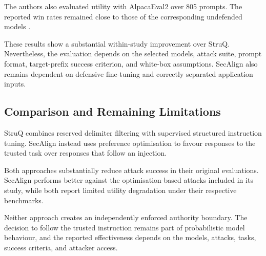 The authors also evaluated utility with AlpacaEval2 over 805 prompts. The
reported win rates remained close to those of the corresponding undefended
models
\parencite{chen2025secalign}.

These results show a substantial within-study improvement over StruQ.
Nevertheless, the evaluation depends on the selected models, attack suite,
prompt format, target-prefix success criterion, and white-box assumptions.
SecAlign also remains dependent on defensive fine-tuning and correctly
separated application inputs.

\subsection{Comparison and Remaining Limitations}
\label{subsec:struq-secalign-comparison}

StruQ combines reserved delimiter filtering with supervised structured
instruction tuning. SecAlign instead uses preference optimisation to favour
responses to the trusted task over responses that follow an injection.

Both approaches substantially reduce attack success in their original
evaluations. SecAlign performs better against the optimisation-based attacks
included in its study, while both report limited utility degradation under
their respective benchmarks.

Neither approach creates an independently enforced authority boundary. The
decision to follow the trusted instruction remains part of probabilistic model
behaviour, and the reported effectiveness depends on the models, attacks,
tasks, success criteria, and attacker access.